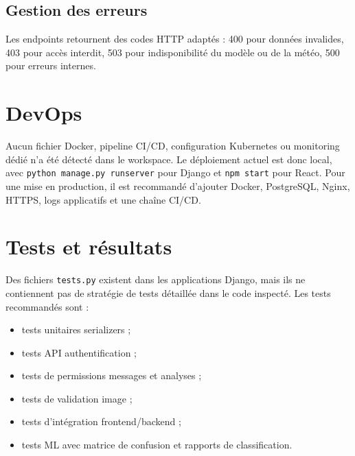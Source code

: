 \subsection{Gestion des erreurs}
Les endpoints retournent des codes HTTP adaptés : 400 pour données invalides, 403 pour accès interdit, 503 pour indisponibilité du modèle ou de la météo, 500 pour erreurs internes.

\section{DevOps}
Aucun fichier Docker, pipeline CI/CD, configuration Kubernetes ou monitoring dédié n'a été détecté dans le workspace. Le déploiement actuel est donc local, avec \texttt{python manage.py runserver} pour Django et \texttt{npm start} pour React. Pour une mise en production, il est recommandé d'ajouter Docker, PostgreSQL, Nginx, HTTPS, logs applicatifs et une chaîne CI/CD.

\section{Tests et résultats}
Des fichiers \texttt{tests.py} existent dans les applications Django, mais ils ne contiennent pas de stratégie de tests détaillée dans le code inspecté. Les tests recommandés sont :
\begin{itemize}[noitemsep]
  \item tests unitaires serializers ;
  \item tests API authentification ;
  \item tests de permissions messages et analyses ;
  \item tests de validation image ;
  \item tests d'intégration frontend/backend ;
  \item tests ML avec matrice de confusion et rapports de classification.
\end{itemize}
